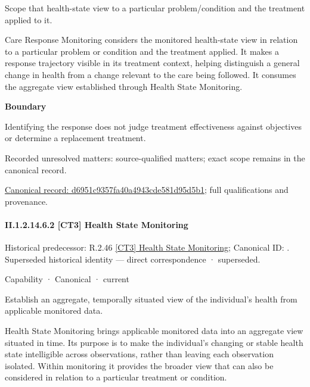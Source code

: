 Scope that health-state view to a particular problem/condition and the treatment applied to it.



Care Response Monitoring considers the monitored health-state view in relation to a particular problem or condition and the treatment applied. It makes a response trajectory visible in its treatment context, helping distinguish a general change in health from a change relevant to the care being followed. It consumes the aggregate view established through Health State Monitoring.



\textbf{Boundary}



Identifying the response does not judge treatment effectiveness against objectives or determine a replacement treatment.


{\small Recorded unresolved matters: source-qualified matters; exact scope remains in the canonical record.}\par
{\footnotesize \href{../../../../../../../continuum/strategy/capability/d6951c9357fa40a4943cde581d95d5b1.md}{Canonical record: d6951c9357fa40a4943cde581d95d5b1}; full qualifications and provenance.}\par
\paragraph*{II.1.2.14.6.2 [CT3] Health State Monitoring}
\label{navigation:II.1.2.14.6.2}

{\small Historical predecessor: R.2.46 \hyperref[element:346f024f74b447a8b6056b9d521837ff]{[CT3] Health State Monitoring}; Canonical ID: \texttt{}. Superseded historical identity — direct correspondence · superseded.}\par
\label{element:d77f22909f8b47dba4cbd95982e576df}
{\small Capability · Canonical · current}\par

Establish an aggregate, temporally situated view of the individual’s health from applicable monitored data.



Health State Monitoring brings applicable monitored data into an aggregate view situated in time. Its purpose is to make the individual's changing or stable health state intelligible across observations, rather than leaving each observation isolated. Within monitoring it provides the broader view that can also be considered in relation to a particular treatment or condition.



